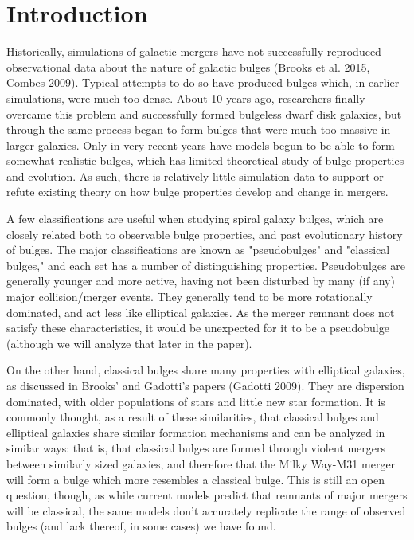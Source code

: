 \documentclass[iop]{emulateapj}
\begin{document}
\section{Introduction}

Historically, simulations of galactic mergers have not successfully reproduced observational data about the nature of galactic bulges (Brooks et al. 2015, Combes 2009). Typical attempts to do so have produced bulges which, in earlier simulations, were much too dense. About 10 years ago, researchers finally overcame this problem and successfully formed bulgeless dwarf disk galaxies, but through the same process began to form bulges that were much too massive in larger galaxies. Only in very recent years have models begun to be able to form somewhat realistic bulges, which has limited theoretical study of bulge properties and evolution. As such, there is relatively little simulation data to support or refute existing theory on how bulge properties develop and change in mergers.

A few classifications are useful when studying spiral galaxy bulges, which are closely related both to observable bulge properties, and past evolutionary history of bulges. The major classifications are known as "pseudobulges" and "classical bulges," and each set has a number of distinguishing properties. Pseudobulges are generally younger and more active, having not been disturbed by many (if any) major collision/merger events. They generally tend to be more rotationally dominated, and act less like elliptical galaxies. As the merger remnant does not satisfy these characteristics, it would be unexpected for it to be a pseudobulge (although we will analyze that later in the paper). 

On the other hand, classical bulges share many properties with elliptical galaxies, as discussed in Brooks' and Gadotti's papers (Gadotti 2009). They are dispersion dominated, with older populations of stars and little new star formation. It is commonly thought, as a result of these similarities, that classical bulges and elliptical galaxies share similar formation mechanisms and can be analyzed in similar ways: that is, that classical bulges are formed through violent mergers between similarly sized galaxies, and therefore that the Milky Way-M31 merger will form a bulge which more resembles a classical bulge. This is still an open question, though, as while current models predict that remnants of major mergers will be classical, the same models don't accurately replicate the range of observed bulges (and lack thereof, in some cases) we have found.
\end{document}
